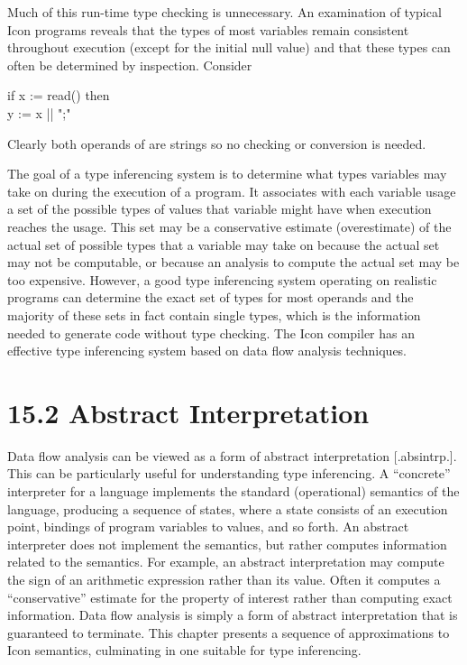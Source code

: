 Much of this run-time type checking is unnecessary. An examination of
typical Icon programs reveals that the types of most variables remain
consistent throughout execution (except for the initial null value)
and that these types can often be determined by inspection. Consider

\goodbreak
\begin{iconcode}
if x := read() then\\
\>y := x || ";"\\
\end{iconcode}


Clearly both operands of {\textbar}{\textbar} are strings so no
checking or conversion is needed.

The goal of a type inferencing system is to determine what types
variables may take on during the execution of a program. It associates
with each variable usage a set of the possible types of values that
variable might have when execution reaches the usage. This set may be
a conservative estimate (overestimate) of the actual set of possible
types that a variable may take on because the actual set may not be
computable, or because an analysis to compute the actual set may be
too expensive. However, a good type inferencing system operating on
realistic programs can determine the exact set of types for most
operands and the majority of these sets in fact contain single types,
which is the information needed to generate code without type
checking. The Icon compiler has an effective type inferencing system
based on data flow analysis techniques.

\section[15.2 Abstract Interpretation ]{15.2 Abstract Interpretation }

Data flow analysis can be viewed as a form of abstract interpretation
[.absintrp.]. This can be particularly useful for understanding type
inferencing. A ``concrete'' interpreter for a language implements the
standard (operational) semantics of the language, producing a sequence
of states, where a state consists of an execution point, bindings of
program variables to values, and so forth. An abstract interpreter
does not implement the semantics, but rather computes information
related to the semantics. For example, an abstract interpretation may
compute the sign of an arithmetic expression rather than its
value. Often it computes a ``conservative'' estimate for the property
of interest rather than computing exact information. Data flow
analysis is simply a form of abstract interpretation that is
guaranteed to terminate. This chapter presents a sequence of
approximations to Icon semantics, culminating in one suitable for type
inferencing.

